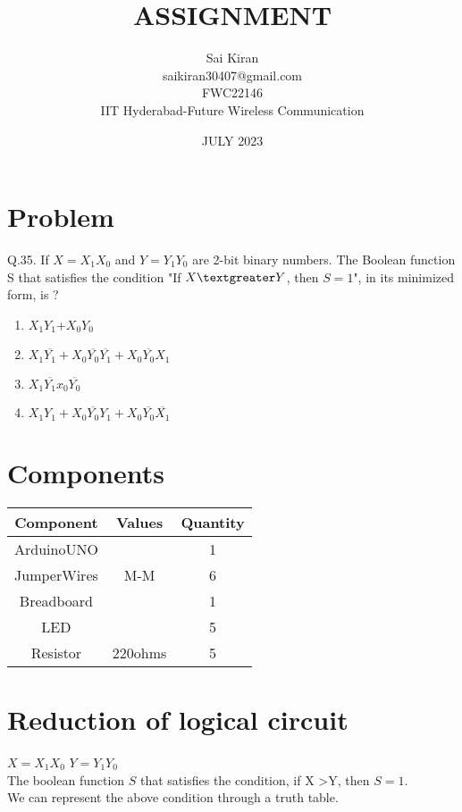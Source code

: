 \documentclass{article}
\title{ASSIGNMENT}
\date{JULY 2023}
\author{Sai Kiran \\saikiran30407@gmail.com\\FWC22146\\IIT Hyderabad-Future Wireless Communication }
\date{}
\begin{document}
\maketitle
 \tableofcontents

\pagebreak
\section{Problem}
 Q.35.  If $X = X_1X_0$ and $Y = Y_1Y_0$ are 2-bit binary numbers. The Boolean function S that satisfies the condition "If $X \textgreater Y$, then $S= 1$", in its minimized form, is ?\\
 \begin{enumerate}
 
     \item$X_1Y_1$+$X_0Y_0$
     \item$X_1\overline{Y_1}+X_0\overline{Y_0}\overline{Y_1}+X_0\overline{Y_0}X_1$
     \item$X_1\overline{Y_1}x_0\overline{Y_0}$
     \item$X_1Y_1+X_0\overline{Y_0}Y_1+X_0\overline{Y_0}\overline{X_1}$
 \end{enumerate}
 
 \section{Components}
  \begin{table}[h]
  \centering
   \begin{tabular}{|c|c|c|}
   \hline
   \textbf{Component}& \textbf{Values} & \textbf{Quantity}\\
\hline
ArduinoUNO &  & 1 \\  
\hline
JumperWires& M-M & 6 \\ 
\hline
Breadboard &  & 1 \\
\hline
LED & &5 \\
\hline
Resistor &220ohms & 5\\
\hline
   \end{tabular}
   \end{table}


\section{Reduction of logical circuit}


    $X=X_1X_0$ $Y=Y_1Y_0$\\
    The boolean function $S$ that satisfies the condition,
    if X \textgreater Y, then  $S=1$.\\
    We can represent the above condition through a truth table.
\end{document}
